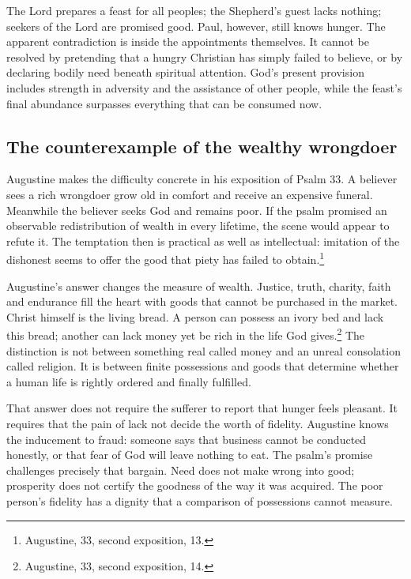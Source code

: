 \clearpage
{}
The Lord prepares a feast for all peoples; the Shepherd's guest lacks nothing; seekers of the Lord are promised good. Paul, however, still knows hunger. The apparent contradiction is inside the appointments themselves. It cannot be resolved by pretending that a hungry Christian has simply failed to believe, or by declaring bodily need beneath spiritual attention. God's present provision includes strength in adversity and the assistance of other people, while the feast's final abundance surpasses everything that can be consumed now.

\subsection{The counterexample of the wealthy wrongdoer}
Augustine makes the difficulty concrete in his exposition of Psalm 33. A believer sees a rich wrongdoer grow old in comfort and receive an expensive funeral. Meanwhile the believer seeks God and remains poor. If the psalm promised an observable redistribution of wealth in every lifetime, the scene would appear to refute it. The temptation then is practical as well as intellectual: imitation of the dishonest seems to offer the good that piety has failed to obtain.\footnote{Augustine,  33, second exposition, 13.}

Augustine's answer changes the measure of wealth. Justice, truth, charity, faith and endurance fill the heart with goods that cannot be purchased in the market. Christ himself is the living bread. A person can possess an ivory bed and lack this bread; another can lack money yet be rich in the life God gives.\footnote{Augustine,  33, second exposition, 14.} The distinction is not between something real called money and an unreal consolation called religion. It is between finite possessions and goods that determine whether a human life is rightly ordered and finally fulfilled.

That answer does not require the sufferer to report that hunger feels pleasant. It requires that the pain of lack not decide the worth of fidelity. Augustine knows the inducement to fraud: someone says that business cannot be conducted honestly, or that fear of God will leave nothing to eat. The psalm's promise challenges precisely that bargain. Need does not make wrong into good; prosperity does not certify the goodness of the way it was acquired. The poor person's fidelity has a dignity that a comparison of possessions cannot measure.

